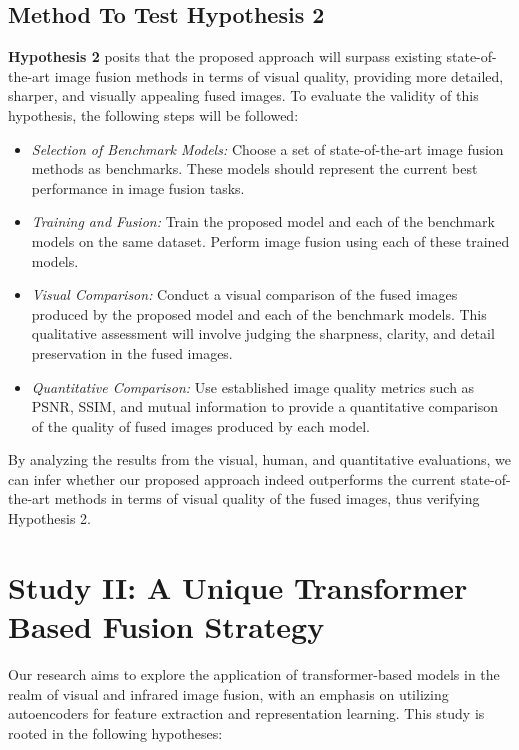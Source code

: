 \subsection{Method To Test Hypothesis 2} \label{subsec:met9}

\textbf{Hypothesis 2} posits that the proposed approach will surpass existing state-of-the-art image fusion methods in terms of visual quality, providing more detailed, sharper, and visually appealing fused images. To evaluate the validity of this hypothesis, the following steps will be followed:

\begin{itemize}
    \item \textit{Selection of Benchmark Models:} Choose a set of state-of-the-art image fusion methods as benchmarks. These models should represent the current best performance in image fusion tasks.

    \item \textit{Training and Fusion:} Train the proposed model and each of the benchmark models on the same dataset. Perform image fusion using each of these trained models.

    \item \textit{Visual Comparison:} Conduct a visual comparison of the fused images produced by the proposed model and each of the benchmark models. This qualitative assessment will involve judging the sharpness, clarity, and detail preservation in the fused images.

    \item \textit{Quantitative Comparison:} Use established image quality metrics such as PSNR, SSIM, and mutual information to provide a quantitative comparison of the quality of fused images produced by each model.

\end{itemize}


By analyzing the results from the visual, human, and quantitative evaluations, we can infer whether our proposed approach indeed outperforms the current state-of-the-art methods in terms of visual quality of the fused images, thus verifying Hypothesis 2.

\section{Study II: A Unique Transformer Based Fusion Strategy}\label{sec:study1}

Our research aims to explore the application of transformer-based models in the realm of visual and infrared image fusion, with an emphasis on utilizing autoencoders for feature extraction and representation learning. This study is rooted in the following hypotheses:

